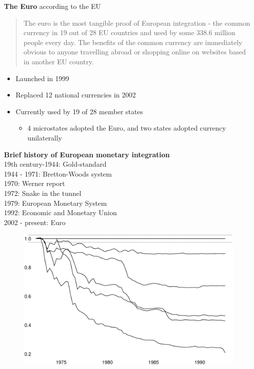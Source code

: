 \documentclass{beamer}
\begin{document}
\begin{frame}
  \textbf{The Euro} according to the EU
  \begin{quote}
    The euro is the most tangible proof of European integration - the common currency in 19 out of 28 EU countries and used by some 338.6 million people every day. The benefits of the common currency are immediately obvious to anyone travelling abroad or shopping online on websites based in another EU country.
  \end{quote}
  \medskip
  \begin{itemize}
    \item Launched in 1999
    \item Replaced 12 national currencies in 2002
    \item Currently used by 19 of 28 member states
    \begin{itemize}
      \item 4 microstates adopted the Euro, and two states adopted currency unilaterally
    \end{itemize}
  \end{itemize}
\end{frame}

\begin{frame}
  \textbf{Brief history of European monetary integration}\\
  \medskip
  19th century-1944: Gold-standard \\
  1944 - 1971: Bretton-Woods system\\
  1970: Werner report\\
  1972: Snake in the tunnel\\
  1979: European Monetary System\\
  1992: Economic and Monetary Union\\
  2002 - present: Euro  
\end{frame}

\begin{frame}
  \begin{figure}
    \includegraphics[scale=.3]{snake.eps}
  \end{figure}
\end{frame}
\end{document}

